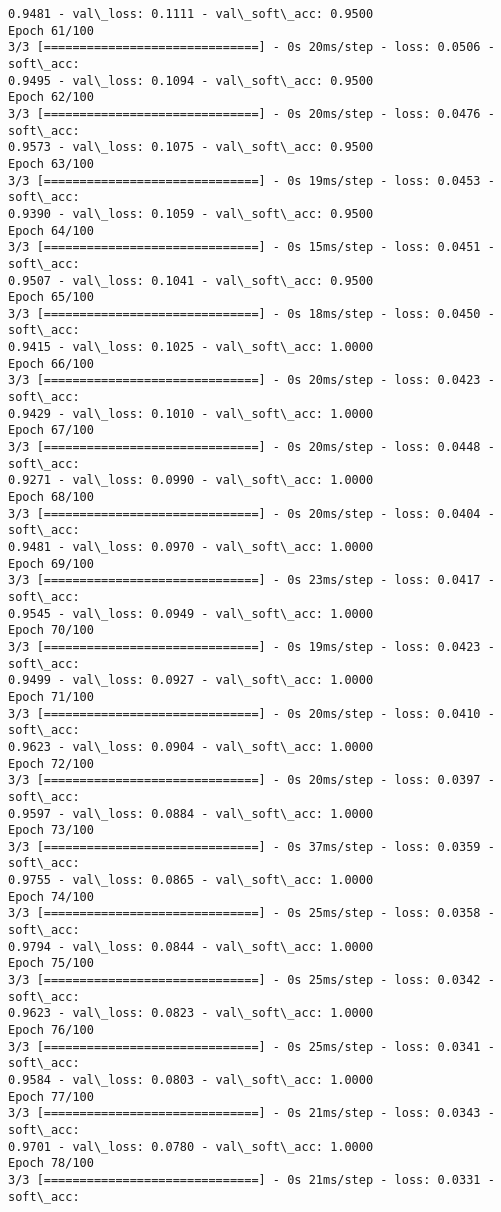 \documentclass[11pt]{article}
\begin{document}
\begin{Verbatim}[commandchars=\\\{\}]
0.9481 - val\_loss: 0.1111 - val\_soft\_acc: 0.9500
Epoch 61/100
3/3 [==============================] - 0s 20ms/step - loss: 0.0506 - soft\_acc:
0.9495 - val\_loss: 0.1094 - val\_soft\_acc: 0.9500
Epoch 62/100
3/3 [==============================] - 0s 20ms/step - loss: 0.0476 - soft\_acc:
0.9573 - val\_loss: 0.1075 - val\_soft\_acc: 0.9500
Epoch 63/100
3/3 [==============================] - 0s 19ms/step - loss: 0.0453 - soft\_acc:
0.9390 - val\_loss: 0.1059 - val\_soft\_acc: 0.9500
Epoch 64/100
3/3 [==============================] - 0s 15ms/step - loss: 0.0451 - soft\_acc:
0.9507 - val\_loss: 0.1041 - val\_soft\_acc: 0.9500
Epoch 65/100
3/3 [==============================] - 0s 18ms/step - loss: 0.0450 - soft\_acc:
0.9415 - val\_loss: 0.1025 - val\_soft\_acc: 1.0000
Epoch 66/100
3/3 [==============================] - 0s 20ms/step - loss: 0.0423 - soft\_acc:
0.9429 - val\_loss: 0.1010 - val\_soft\_acc: 1.0000
Epoch 67/100
3/3 [==============================] - 0s 20ms/step - loss: 0.0448 - soft\_acc:
0.9271 - val\_loss: 0.0990 - val\_soft\_acc: 1.0000
Epoch 68/100
3/3 [==============================] - 0s 20ms/step - loss: 0.0404 - soft\_acc:
0.9481 - val\_loss: 0.0970 - val\_soft\_acc: 1.0000
Epoch 69/100
3/3 [==============================] - 0s 23ms/step - loss: 0.0417 - soft\_acc:
0.9545 - val\_loss: 0.0949 - val\_soft\_acc: 1.0000
Epoch 70/100
3/3 [==============================] - 0s 19ms/step - loss: 0.0423 - soft\_acc:
0.9499 - val\_loss: 0.0927 - val\_soft\_acc: 1.0000
Epoch 71/100
3/3 [==============================] - 0s 20ms/step - loss: 0.0410 - soft\_acc:
0.9623 - val\_loss: 0.0904 - val\_soft\_acc: 1.0000
Epoch 72/100
3/3 [==============================] - 0s 20ms/step - loss: 0.0397 - soft\_acc:
0.9597 - val\_loss: 0.0884 - val\_soft\_acc: 1.0000
Epoch 73/100
3/3 [==============================] - 0s 37ms/step - loss: 0.0359 - soft\_acc:
0.9755 - val\_loss: 0.0865 - val\_soft\_acc: 1.0000
Epoch 74/100
3/3 [==============================] - 0s 25ms/step - loss: 0.0358 - soft\_acc:
0.9794 - val\_loss: 0.0844 - val\_soft\_acc: 1.0000
Epoch 75/100
3/3 [==============================] - 0s 25ms/step - loss: 0.0342 - soft\_acc:
0.9623 - val\_loss: 0.0823 - val\_soft\_acc: 1.0000
Epoch 76/100
3/3 [==============================] - 0s 25ms/step - loss: 0.0341 - soft\_acc:
0.9584 - val\_loss: 0.0803 - val\_soft\_acc: 1.0000
Epoch 77/100
3/3 [==============================] - 0s 21ms/step - loss: 0.0343 - soft\_acc:
0.9701 - val\_loss: 0.0780 - val\_soft\_acc: 1.0000
Epoch 78/100
3/3 [==============================] - 0s 21ms/step - loss: 0.0331 - soft\_acc:

\end{Verbatim}
\end{document}
